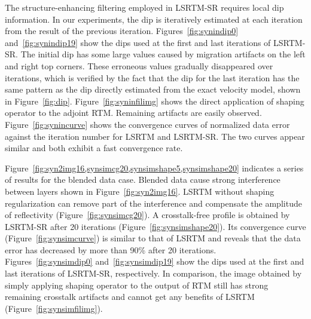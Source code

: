 The structure-enhancing filtering employed in LSRTM-SR requires local dip information.
In our experiments, the dip is iteratively estimated at each iteration from the result of the previous iteration.
Figures~\ref{fig:synindip0} and~\ref{fig:synindip19} show the dips used at the first and last iterations of LSRTM-SR.
The initial dip has some large values caused by migration artifacts on the left and right top corners.
These erroneous values gradually disappeared over iterations, which is verified by the fact that
the dip for the last iteration has the same pattern as the dip directly estimated from the exact velocity model, shown in Figure~\ref{fig:dip}.
Figure~\ref{fig:syninfilimg} shows the direct application of shaping operator to the adjoint RTM.
Remaining artifacts are easily observed.
Figure~\ref{fig:synincurve} shows the convergence curves of normalized data error against the iteration number for LSRTM and LSRTM-SR.
The two curves appear similar and both exhibit a fast convergence rate.


Figure~\ref{fig:syn2img16,synsimcg20,synsimshape5,synsimshape20} indicates a series of results for the blended data case.
Blended data cause strong interference between layers shown in Figure~\ref{fig:syn2img16}. 
LSRTM without shaping regularization can remove part of the interference and compensate the amplitude of reflectivity (Figure~\ref{fig:synsimcg20}).
A crosstalk-free profile is obtained by LSRTM-SR after 20 iterations (Figure~\ref{fig:synsimshape20}). 
Its convergence curve (Figure~\ref{fig:synsimcurve}) is similar to that of LSRTM 
and reveals that the data error has decreased by more than 90\% after 20 iterations.
Figures~\ref{fig:synsimdip0} and~\ref{fig:synsimdip19} show the dips used at the first and last iterations of LSRTM-SR, respectively.
In comparison, the image obtained by simply applying shaping operator to the output of RTM
still has strong remaining crosstalk artifacts
and cannot get any benefits of LSRTM (Figure~\ref{fig:synsimfilimg}).

